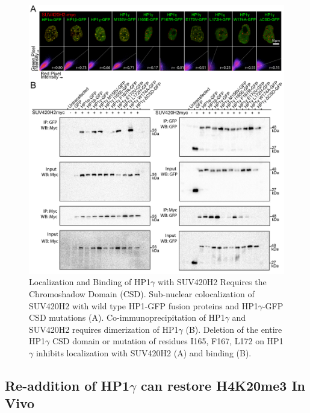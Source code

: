 \documentclass[onehalf,12pt]{beavtex}
\begin{document}
  \begin{figure}
  
  {\centering \includegraphics[width=1\linewidth, ]{./figure/results/HP1gSUV420H2alt} 
  
  }
  
  \caption[Localization and Binding of HP1$\gamma$ with SUV420H2 Requires the Chromoshadow Domain (CSD)]{Localization and Binding of HP1$\gamma$ with SUV420H2 Requires the Chromoshadow Domain (CSD). Sub-nuclear colocalization of SUV420H2 with wild type HP1-GFP fusion proteins and HP1$\gamma$-GFP CSD mutations (A).  Co-immunoprecipitation of HP1$\gamma$ and SUV420H2 requires dimerization of HP1$\gamma$ (B). Deletion of the entire HP1$\gamma$ CSD domain or mutation of residues I165, F167, L172 on HP1$\gamma$ inhibits localization with SUV420H2 (A) and binding (B).}\label{fig:HP1gSUValt}
  \end{figure}
  
  \subsection{\texorpdfstring{Re-addition of HP1\(\gamma\) can restore
  H4K20me3 In
  Vivo}{Re-addition of HP1\textbackslash{}gamma can restore H4K20me3 In Vivo}}\label{re-addition-of-hp1gamma-can-restore-h4k20me3-in-vivo}
  
\end{document}
